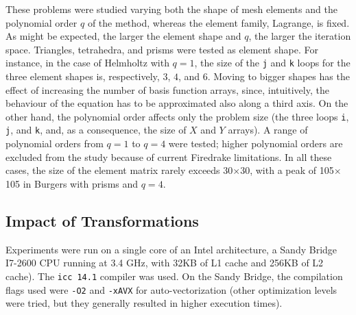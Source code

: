 These problems were studied varying both the shape of mesh elements and the polynomial order $q$ of the method, whereas the element family, Lagrange, is fixed. As might be expected, the larger the element shape and $q$, the larger the iteration space. Triangles, tetrahedra, and prisms were tested as element shape. For instance, in the case of Helmholtz with $q=1$, the size of the \texttt{j} and \texttt{k} loops for the three element shapes is, respectively, $3$, $4$, and $6$. Moving to bigger shapes has the effect of increasing the number of basis function arrays, since, intuitively, the behaviour of the equation has to be approximated also along a third axis. On the other hand, the polynomial order affects only the problem size (the three loops \texttt{i}, \texttt{j}, and \texttt{k}, and, as a consequence, the size of $X$ and $Y$ arrays). A range of polynomial orders from $q=1$ to $q=4$ were tested; higher polynomial orders are excluded from the study because of current Firedrake limitations. In all these cases, the size of the element matrix rarely exceeds 30$\times$30, with a peak of 105$\times$105 in Burgers with prisms and $q=4$.


\subsection{Impact of Transformations}

Experiments were run on a single core of an Intel architecture, a Sandy Bridge I7-2600 CPU running at 3.4 GHz, with 32KB of L1 cache and 256KB of L2 cache). The \texttt{icc 14.1}  compiler was used. On the Sandy Bridge, the compilation flags used were \texttt{-O2} and \texttt{-xAVX} for auto-vectorization (other optimization levels were tried, but they generally resulted in higher execution times).

